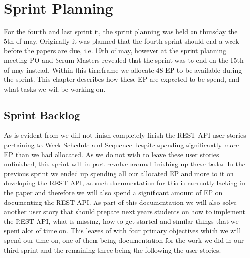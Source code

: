 \chapter{Sprint Planning}
For the fourth and last sprint it, the sprint planning was held on thursday the 5th of may.
Originally it was planned that the fourth sprint should end a week before the papers are due, i.e. 19th of may, however at the sprint planning meeting PO and Scrum Masters revealed that the sprint was to end on the 15th of may instead.
Within this timeframe we allocate 48 EP to be available during the sprint.
This chapter describes how these EP are expected to be spend, and what tasks we will be working on.

\section{Sprint Backlog}
As is evident from  we did not finish completely finish the REST API user stories pertaining to Week Schedule and Sequence despite spending significantly more EP than we had allocated.
As we do not wish to leave these user stories unfinished, this sprint will in part revolve around finishing up these tasks.
In the previous sprint we ended up spending all our allocated EP and more to it on developing the REST API, as such documentation for this is currently lacking in the paper and therefore we will also spend a significant amount of EP on documenting the REST API.
As part of this documentation we will also solve another user story that should prepare next years students on how to implement the REST API, what is missing, how to get started and similar things that we spent alot of time on.
This leaves of with four primary objectives which we will spend our time on, one of them being documentation for the work we did in our third sprint and the remaining three being the following the user stories.

\bigskip \noindent
{}

\medskip \noindent
{}

\medskip \noindent
{}

